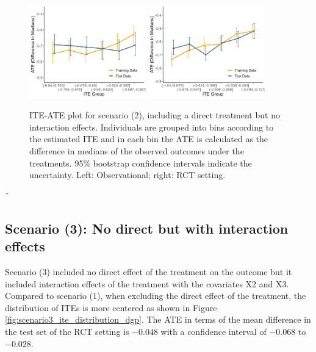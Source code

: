 \begin{figure}[htbp]
\centering
\includegraphics[width=0.45\textwidth]{img/results/observ_scenario2_ITE_cATE.png}
\includegraphics[width=0.45\textwidth]{img/results/rct_scenario2_ITE_cATE.png}
\caption{ITE-ATE plot for scenario (2), including a direct treatment but no interaction effects. Individuals are grouped into bins according to the estimated ITE and in each bin the ATE is calculated as the difference in medians of the observed outcomes under the treatments. 95\% bootstrap confidence intervals indicate the uncertainty. Left: Observational; right: RCT setting.}
\label{fig:scenario2_ite_cATE}
\end{figure}



\clearpage 
¨
\subsection{Scenario (3): No direct but with interaction effects}

Scenario (3) included no direct effect of the treatment on the outcome but it included interaction effects of the treatment with the covariates X2 and X3. Compared to scenario (1), when excluding the direct effect of the treatment, the distribution of ITEs is more centered as shown in Figure \ref{fig:scenario3_ite_distribution_dgp}. The ATE in terms of the mean difference in the test set of the RCT setting is $-0.048$ with a confidence interval of $-0.068$ to $-0.028$. 



